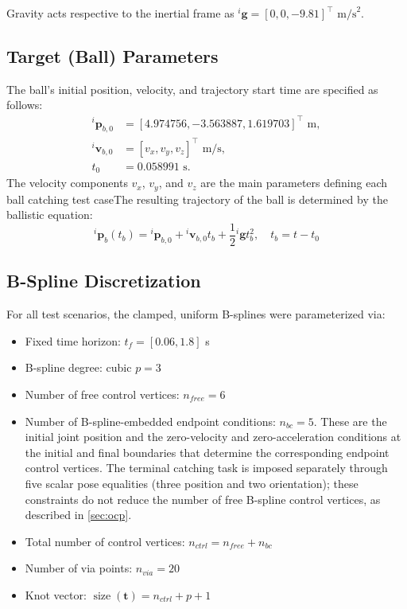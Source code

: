 Gravity acts respective to the inertial frame as ${}^i\mathbf{g} = [0, 0, -9.81]^\top \text{ m/s}^2$.

\subsection{Target (Ball) Parameters}

The ball's initial position, velocity, and trajectory start time are specified as follows:
\begin{align}
    {}^i\mathbf{p}_{b,0} &= [4.974756, -3.563887, 1.619703]^\top \text{ m}, \\
    {}^i\mathbf{v}_{b,0} &= [v_x, v_y, v_z]^\top \text{ m/s}, \\
    t_0 &= 0.058991 \text{ s}.
\end{align}
The velocity components $v_x$, $v_y$, and $v_z$ are the main parameters defining each ball catching test caseThe resulting trajectory of the ball is determined by the ballistic equation:
\begin{equation}
    {}^i\mathbf{p}_b(t_b) = {}^i\mathbf{p}_{b,0} + {}^i\mathbf{v}_{b,0} t_b + \frac{1}{2} {}^i\mathbf{g} t_b^2, 
    \quad t_b = t-t_0
\end{equation}

\subsection{B-Spline Discretization}

For all test scenarios, the clamped, uniform B-splines were parameterized via:
\begin{itemize}
    \item Fixed time horizon: $t_f = [0.06,1.8]$ s
    \item B-spline degree: cubic $p = 3$
    \item Number of free control vertices: $n_{free} = 6$
    \item Number of B-spline-embedded endpoint conditions: $n_{bc} = 5$. These are the initial joint position and the zero-velocity and zero-acceleration conditions at the initial and final boundaries that determine the corresponding endpoint control vertices. The terminal catching task is imposed separately through five scalar pose equalities (three position and two orientation); these constraints do not reduce the number of free B-spline control vertices, as described in \cref{sec:ocp}.
    \item Total number of control vertices: $n_{ctrl} = n_{free} + n_{bc}$
    \item Number of via points: $n_{via} = 20$
    \item Knot vector: $\operatorname{size}(\mathbf{t}) = n_{ctrl} + p + 1$
\end{itemize}

